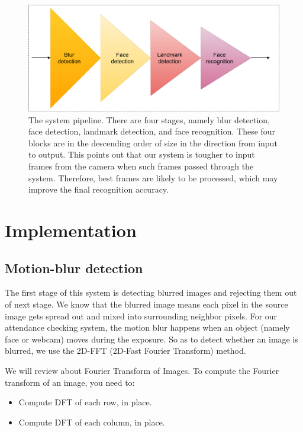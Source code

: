 \documentclass[journal, twocolumn]{IEEEtran}
\begin{document}
\begin{figure}
    \centering
    \includegraphics[width=\linewidth]{img/system-pipeline.png}
	\caption{The system pipeline. There are four stages, namely blur detection, face detection, landmark detection, and face recognition. These four blocks are in the descending order of size in the direction from input to output. This points out that our system is tougher to input frames from the camera when such frames passed through the system. Therefore, best frames are likely to be processed, which may improve the final recognition accuracy.}\label{fig:system}
\end{figure}


\medskip
\section{Implementation}
\label{implementation}


\subsection{Motion-blur detection}
\label{motion-blur-detection}

The first stage of this system is detecting blurred images and rejecting them out of next stage. We know that the blurred image means each pixel in the source image gets spread out and mixed into surrounding neighbor pixels. For our attendance checking system, the motion blur happens when an object (namely face or webcam) moves during the exposure. So as to detect whether an image is blurred, we use the 2D-FFT (2D-Fast Fourier Transform) method.

 We will review about Fourier Transform of Images. To compute the Fourier transform of an image, you need to:
\begin{itemize}
\item Compute DFT of each row, in place.
\item Compute DFT of each column, in place.
\end{itemize}  
\end{document}
